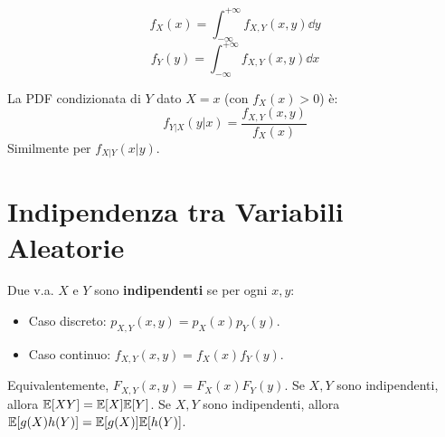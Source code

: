\documentclass[12pt,a4paper]{article}
\begin{document}
\begin{example}
\begin{definition}
\[ f_X(x) = \int_{-\infty}^{+\infty} f_{X,Y}(x,y) \dd y \]
\[ f_Y(y) = \int_{-\infty}^{+\infty} f_{X,Y}(x,y) \dd x \]
\end{definition}

\begin{definition}
La PDF condizionata di $Y$ dato $X=x$ (con $f_X(x)>0$) è:
\[ f_{Y|X}(y|x) = \frac{f_{X,Y}(x,y)}{f_X(x)} \]
Similmente per $f_{X|Y}(x|y)$.
\end{definition}

\section{Indipendenza tra Variabili Aleatorie}
\begin{definition}[Indipendenza]
Due v.a. $X$ e $Y$ sono \textbf{indipendenti} se per ogni $x,y$:
\begin{itemize}
    \item Caso discreto: $p_{X,Y}(x,y) = p_X(x) p_Y(y)$.
    \item Caso continuo: $f_{X,Y}(x,y) = f_X(x) f_Y(y)$.
\end{itemize}
Equivalentemente, $F_{X,Y}(x,y) = F_X(x) F_Y(y)$.
Se $X,Y$ sono indipendenti, allora $\mathbb{E}[XY] = \mathbb{E}[X]\mathbb{E}[Y]$.
Se $X,Y$ sono indipendenti, allora $\mathbb{E}[g(X)h(Y)] = \mathbb{E}[g(X)]\mathbb{E}[h(Y)]$.
\end{definition}


\end{example}
\end{document}

